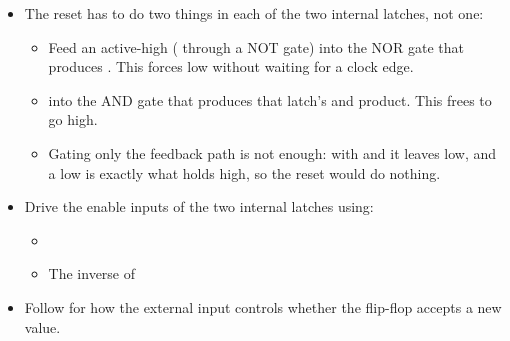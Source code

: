 \begin{itemize}
  \item The reset has to do two things in each of the two internal latches, not one:
    \begin{itemize}
      \item Feed an active-high  ( through a NOT gate) into the NOR gate
        that produces . This forces  low without waiting for a clock edge.
      \item {}  into the AND gate that produces that latch's  and
         product. This frees  to go high.
      \item Gating only the  feedback path is not enough: with  and
         it leaves  low, and a low  is exactly what holds 
        high, so the reset would do nothing.
    \end{itemize}
  \item Drive the enable inputs of the two internal latches using:
    \begin{itemize}
      \item {}
      \item The inverse of 
    \end{itemize}
  \item Follow  for how the external  input controls whether the
    flip-flop accepts a new value.
\end{itemize}

